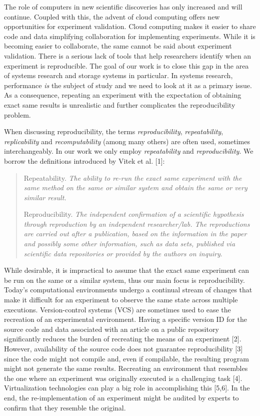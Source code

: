 \documentclass[10pt,reprint]{sigplanconf}
\begin{document}
The role of computers in new scientific discoveries has only increased
and will continue. Coupled with this, the advent of cloud computing
offers new opportunities for experiment validation. Cloud computing
makes it easier to share code and data simplifying collaboration for
implementing experiments. While it is becoming easier to collaborate,
the same cannot be said about experiment validation. There is a serious
lack of tools that help researchers identify when an experiment is
reproducible. The goal of our work is to close this gap in the area of
systems research and storage systems in particular. In systems research,
performance \emph{is} the subject of study and we need to look at it as
a primary issue. As a consequence, repeating an experiment with the
expectation of obtaining exact same results is unrealistic and further
complicates the reproducibility problem.

When discussing reproducibility, the terms \emph{reproducibility},
\emph{repeatability}, \emph{replicability} and \emph{recomputability}
(among many others) are often used, sometimes interchangeably. In our
work we only employ \emph{repeatability} and \emph{reproducibility}. We
borrow the definitions introduced by Vitek et al. {[}1{]}:

\begin{quote}
Repeatability. \emph{The ability to re-run the exact same experiment
with the same method on the same or similar system and obtain the same
or very similar result.}

Reproducibility. \emph{The independent confirmation of a scientific
hypothesis through reproduction by an independent researcher/lab. The
reproductions are carried out after a publication, based on the
information in the paper and possibly some other information, such as
data sets, published via scientific data repositories or provided by the
authors on inquiry}.
\end{quote}

While desirable, it is impractical to assume that the exact same
experiment can be run on the same or a similar system, thus our main
focus is reproducibility. Today's computational environments undergo a
continual stream of changes that make it difficult for an experiment to
observe the same state across multiple executions. Version-control
systems (VCS) are sometimes used to ease the recreation of an
experimental environment. Having a specific version ID for the source
code and data associated with an article on a public repository
significantly reduces the burden of recreating the means of an
experiment {[}2{]}. However, availability of the source code does not
guarantee reproducibility {[}3{]} since the code might not compile and,
even if compilable, the resulting program might not generate the same
results. Recreating an environment that resembles the one where an
experiment was originally executed is a challenging task {[}4{]}.
Virtualization technologies can play a big role in accomplishing this
{[}5,6{]}. In the end, the re-implementation of an experiment might be
audited by experts to confirm that they resemble the original.
\end{document}
